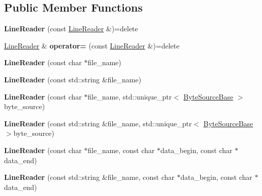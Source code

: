 \subsection*{Public Member Functions}
\begin{DoxyCompactItemize}
\item 
\mbox{\label{classio_1_1LineReader_a84f2957de769bb701eaaddfd8bc004dd}} 
{\bfseries Line\+Reader} (const \hyperlink{classio_1_1LineReader}{Line\+Reader} \&)=delete
\item 
\mbox{\label{classio_1_1LineReader_a9ebd7beca16060ffc0ea8df3c0c6ff25}} 
\hyperlink{classio_1_1LineReader}{Line\+Reader} \& {\bfseries operator=} (const \hyperlink{classio_1_1LineReader}{Line\+Reader} \&)=delete
\item 
\mbox{\label{classio_1_1LineReader_a81a75d3f53725d35822f490007520e29}} 
{\bfseries Line\+Reader} (const char $\ast$file\+\_\+name)
\item 
\mbox{\label{classio_1_1LineReader_ab0eb26f44fa6b18f9c39dfb2561ac882}} 
{\bfseries Line\+Reader} (const std\+::string \&file\+\_\+name)
\item 
\mbox{\label{classio_1_1LineReader_af4ebb130a7d6c78356573f6d0304266c}} 
{\bfseries Line\+Reader} (const char $\ast$file\+\_\+name, std\+::unique\+\_\+ptr$<$ \hyperlink{classio_1_1ByteSourceBase}{Byte\+Source\+Base} $>$byte\+\_\+source)
\item 
\mbox{\label{classio_1_1LineReader_ab625b3a8001dca811b0e211c6cfc1b28}} 
{\bfseries Line\+Reader} (const std\+::string \&file\+\_\+name, std\+::unique\+\_\+ptr$<$ \hyperlink{classio_1_1ByteSourceBase}{Byte\+Source\+Base} $>$byte\+\_\+source)
\item 
\mbox{\label{classio_1_1LineReader_ad5a65d6f23474884061a77ea858c042b}} 
{\bfseries Line\+Reader} (const char $\ast$file\+\_\+name, const char $\ast$data\+\_\+begin, const char $\ast$data\+\_\+end)
\item 
\mbox{\label{classio_1_1LineReader_a0a52d864b46442a253443cac1367366e}} 
{\bfseries Line\+Reader} (const std\+::string \&file\+\_\+name, const char $\ast$data\+\_\+begin, const char $\ast$data\+\_\+end)

\end{DoxyCompactItemize}
